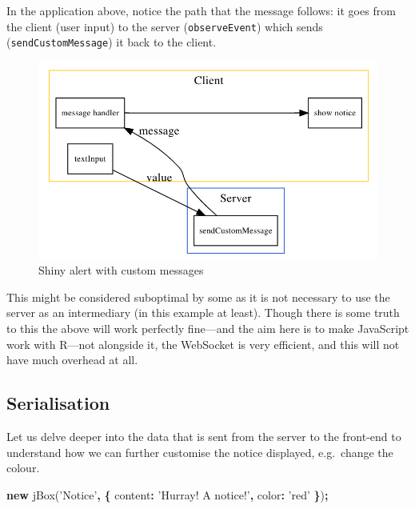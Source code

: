 \documentclass[10pt,]{krantz}
\makeatletter
\newenvironment{Shaded}{\begin{snugshade}}{\end{snugshade}}
\newcommand{\AttributeTok}[1]{\textcolor[rgb]{0.61,0.61,0.61}{#1}}
\newcommand{\DataTypeTok}[1]{\textcolor[rgb]{0.27,0.27,0.27}{#1}}
\newcommand{\KeywordTok}[1]{\textcolor[rgb]{0.27,0.27,0.27}{\textbf{#1}}}
\newcommand{\NormalTok}[1]{#1}
\newcommand{\OperatorTok}[1]{\textcolor[rgb]{0.43,0.43,0.43}{\textbf{#1}}}
\newcommand{\StringTok}[1]{\textcolor[rgb]{0.5,0.5,0.5}{#1}}
\newenvironment{kframe}{%
\medskip{}
\setlength{\fboxsep}{.8em}
 \def\at@end@of@kframe{}%
 \ifinner\ifhmode%
  \def\at@end@of@kframe{\end{minipage}}%
  \begin{minipage}{\columnwidth}%
 \fi\fi%
 \def\FrameCommand##1{\hskip\@totalleftmargin \hskip-\fboxsep
 \colorbox{shadecolor}{##1}\hskip-\fboxsep
     \hskip-\linewidth \hskip-\@totalleftmargin \hskip\columnwidth}%
 \MakeFramed {\advance\hsize-\width
   \@totalleftmargin\z@ \linewidth\hsize
   \@setminipage}}%
 {\par\unskip\endMakeFramed%
 \at@end@of@kframe}
\renewenvironment{Shaded}{\begin{kframe}}{\end{kframe}}
\makeatother
\begin{document}
In the application above, notice the path that the message follows: it goes from the client (user input) to the server (\texttt{observeEvent}) which sends (\texttt{sendCustomMessage}) it back to the client.

\begin{figure}[H]

{\centering \includegraphics[width=1\linewidth]{images/04-custom-msg} 

}

\caption{Shiny alert with custom messages}\label{fig:shiny-alert-diagram}
\end{figure}

This might be considered suboptimal by some as it is not necessary to use the server as an intermediary (in this example at least). Though there is some truth to this the above will work perfectly fine---and the aim here is to make JavaScript work with R---not alongside it, the WebSocket is very efficient, and this will not have much overhead at all.

\hypertarget{shiny-intro-serialise}{%
\subsection{Serialisation}\label{shiny-intro-serialise}}

Let us delve deeper into the data that is sent from the server to the front-end to understand how we can further customise the notice displayed, e.g.~change the colour.

\begin{Shaded}
\begin{Highlighting}[]
\KeywordTok{new} \AttributeTok{jBox}\NormalTok{(}\StringTok{'Notice'}\OperatorTok{,} \OperatorTok{\{}
  \DataTypeTok{content}\OperatorTok{:} \StringTok{'Hurray! A notice!'}\OperatorTok{,}
  \DataTypeTok{color}\OperatorTok{:} \StringTok{'red'}
\OperatorTok{\}}\NormalTok{)}\OperatorTok{;}
\end{Highlighting}
\end{Shaded}
\end{document}
